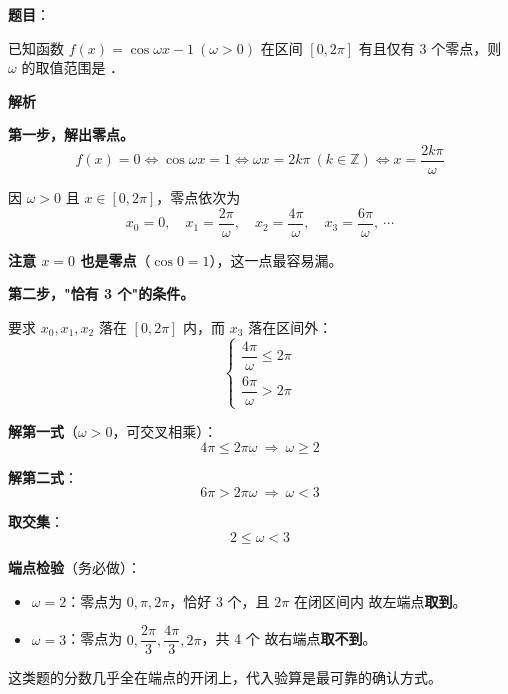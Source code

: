 \begin{answer}

\textbf{题目}：

已知函数 $f(x)=\cos\omega x-1\ (\omega>0)$ 在区间 $[0,2\pi]$ 有且仅有 $3$ 个零点，则 $\omega$ 的取值范围是 \gkblank{}．

\textbf{解析}

\textbf{第一步，解出零点。}
\nopagebreak[4]
\[f(x)=0\iff\cos\omega x=1\iff\omega x=2k\pi\ (k\in\mathbb Z)\iff x=\frac{2k\pi}\omega\]

因 $\omega>0$ 且 $x\in[0,2\pi]$，零点依次为
\nopagebreak[4]
\[x_0=0,\quad x_1=\frac{2\pi}\omega,\quad x_2=\frac{4\pi}\omega,\quad x_3=\frac{6\pi}\omega,\ \cdots\]

\textbf{注意 $x=0$ 也是零点}（$\cos0=1$），这一点最容易漏。

\textbf{第二步，"恰有 3 个"的条件。}

要求 $x_0,x_1,x_2$ 落在 $[0,2\pi]$ 内，而 $x_3$ 落在区间外：
\nopagebreak[4]
\[\begin{cases}\dfrac{4\pi}\omega\le2\pi\\[3mm] \dfrac{6\pi}\omega>2\pi\end{cases}\]

\textbf{解第一式}（$\omega>0$，可交叉相乘）：
\nopagebreak[4]
\[4\pi\le2\pi\omega\ \Longrightarrow\ \omega\ge2\]

\textbf{解第二式}：
\nopagebreak[4]
\[6\pi>2\pi\omega\ \Longrightarrow\ \omega<3\]

\textbf{取交集}：
\nopagebreak[4]
\[2\le\omega<3\]

\begin{gktip}
\textbf{端点检验}（务必做）：
\begin{itemize}
\item $\omega=2$：零点为 $0,\pi,2\pi$，恰好 3 个，且 $2\pi$ 在闭区间内  故左端点\textbf{取到}。
\item $\omega=3$：零点为 $0,\dfrac{2\pi}3,\dfrac{4\pi}3,2\pi$，共 4 个  故右端点\textbf{取不到}。
\end{itemize}

这类题的分数几乎全在端点的开闭上，代入验算是最可靠的确认方式。
\end{gktip}

\gkanswer{答案：$[2,3)$}

\par\medskip

\end{answer}

